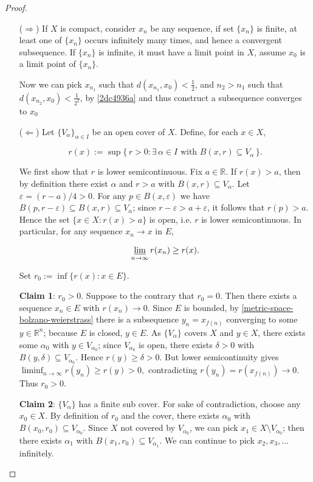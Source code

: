\begin{proof}
    \begin{enumerate}
        \item[($\Rightarrow$)]
        If $X$ is compact, consider $x_n$ be any sequence, if set $\{ x_n \}$ is finite, at least 
    one of $\{ x_n \}$ occurs infinitely many times, and hence a convergent subsequence. 
    If $\{ x_n \}$ is infinite, it must have a limit point in $X$, assume $x_0$ is a limit point of $\{ x_n \}$.

    Now we can pick $x_{n_1}$ such that $d(x_{n_1}, x_0) < \frac{1}{2}$, and $n_2 > n_1$ such that 
    $d(x_{n_2}, x_0) < \frac{1}{2^2}$, by \cref{2dc4936a} and thus construct a subsequence converges to $x_0$

        \item[($\Leftarrow$)]
Let $\{V_\alpha\}_{\alpha \in I}$ be an open cover of $X$. Define, for each $x \in X$,

\[
  r(x) := \sup\{\, r > 0 : \exists\, \alpha \in I \text{ with } B(x,r) \subseteq V_\alpha \,\}.
\]


We first show that $r$ is lower semicontinuous. Fix $a \in \mathbb{R}$. 
If $r(x) > a$,
then by definition there exist $\alpha$ and $r>a$ with $B(x,r) \subseteq V_\alpha$.
Let $\varepsilon = (r-a)/4 > 0$. For any $p \in B(x,\varepsilon)$ we have
$B(p,r-\varepsilon) \subseteq B(x,r) \subseteq V_\alpha$; since $r-\varepsilon > a+\varepsilon$,
it follows that $r(p) > a$. Hence the set $\{x \in X : r(x) > a\}$ is open, i.e. $r$ is
lower semicontinuous. In particular, for any sequence $x_n \to x$ in $E$,

\[
  \varliminf_{n \to \infty} r(x_n) \ge r(x).
\]

Set $r_0 := \inf\{ r(x) : x \in E \}$.

\textbf{Claim 1}: $r_0 > 0$. Suppose to the contrary that $r_0 = 0$. Then there exists a
sequence $x_n \in E$ with $r(x_n) \to 0$. Since $E$ is bounded, by \cref{metric-space-bolzano-weierstrass}
there is a subsequence $y_n = x_{f(n)}$ converging to some $y \in \mathbb{R}^n$; because
$E$ is closed, $y \in E$. As $\{V_\alpha\}$ covers $X$ and $y \in X$, there exists some
$\alpha_0$ with $y \in V_{\alpha_0}$; since $V_{\alpha_0}$ is open, there exists
$\delta>0$ with $B(y,\delta) \subseteq V_{\alpha_0}$. Hence $r(y) \ge \delta > 0$.
But lower semicontinuity gives
$
  \liminf_{n \to \infty} r(y_n) \ge r(y) > 0,
$
contradicting $r(y_n)=r(x_{f(n)}) \to 0$. Thus $r_0>0$.

\textbf{Claim 2}: $\{V_\alpha\}$ has a finite sub cover. For sake of contradiction, choose any $x_0 \in X$.
By definition of $r_0$ and the cover, there exists $\alpha_0$ with
$B(x_0,r_0) \subseteq V_{\alpha_0}$. Since $X$ not covered by $V_{\alpha_0}$,
we can pick $x_1 \in X \setminus V_{\alpha_0}$; then there exists $\alpha_1$
with $B(x_1,r_0) \subseteq V_{\alpha_1}$. We can continue to pick $x_2,x_3,\dots$ infinitely.


\end{enumerate}
\end{proof}
